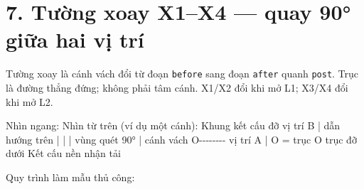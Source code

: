 \documentclass[
  11pt,
  a4paper,
]{article}
\newenvironment{Shaded}{}{}
\newcommand{\NormalTok}[1]{#1}
\begin{document}
\section{7. Tường xoay X1--X4 --- quay 90° giữa hai vị
trí}\label{tux1b0ux1eddng-xoay-x1x4-quay-90-giux1eefa-hai-vux1ecb-truxed}

Tường xoay là cánh vách đổi từ đoạn \texttt{before} sang đoạn
\texttt{after} quanh \texttt{post}. Trục là đường thẳng đứng; không phải
tâm cánh. X1/X2 đổi khi mở L1; X3/X4 đổi khi mở L2.

\begin{Shaded}
\begin{Highlighting}[]
\NormalTok{Nhìn ngang:                     Nhìn từ trên (ví dụ một cánh):}
\NormalTok{Khung kết cấu đỡ                 vị trí B}
\NormalTok{       | dẫn hướng trên             |}
\NormalTok{       |                            |  vùng quét 90°}
\NormalTok{       | cánh vách                  O{-}{-}{-}{-}{-}{-}{-}{-} vị trí A}
\NormalTok{       |                            O = trục}
\NormalTok{       O trục đỡ dưới}
\NormalTok{Kết cấu nền nhận tải}
\end{Highlighting}
\end{Shaded}

Quy trình làm mẫu thủ công:
\end{document}
